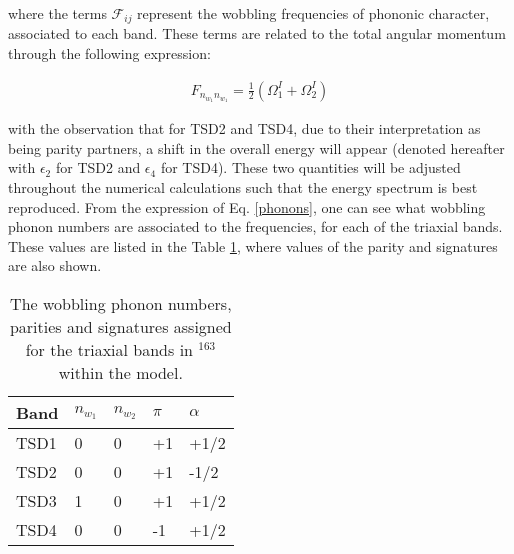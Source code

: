 \documentclass[%
 reprint,
 amsmath,
 amssymb,
 aps,
]{revtex4-2}
\begin{document}
where the terms $\mathcal{F}_{ij}$ represent the wobbling frequencies of phononic character, associated to each band. These terms are related to the total angular momentum through the following expression:

\begin{align}
    F_{n_{w_1}n_{w_1}}=\frac{1}{2}\left(\Omega_1^I+\Omega_2^I\right) \label{phonons}
\end{align}

with the observation that for TSD2 and TSD4, due to their interpretation as being parity partners, a shift in the overall energy will appear (denoted hereafter with $\epsilon_2$ for TSD2 and $\epsilon_4$ for TSD4). These two quantities will be adjusted throughout the numerical calculations such that the energy spectrum is best reproduced. From the expression of Eq. \ref{phonons}, one can see what wobbling phonon numbers are associated to the frequencies, for each of the triaxial bands. These values are listed in the Table \ref{tabular_phonon_numbers}, where values of the parity and signatures are also shown.

\begin{table}
    \centering
  \begin{tabular}{lllll}
  \hline
Band & $n_{w_1}$ & $n_{w_2}$ & $\pi$ & $\alpha$ \\
\hline
\hline
TSD1 &     0      &       0    &     +1  &    +1/2      \\
TSD2 &    0       &       0    &   +1    &        -1/2  \\
TSD3 &     1      &     0      &    +1   &        +1/2  \\
TSD4 &     0      &     0      &    -1   &     +1/2    \\
\hline
\end{tabular}
    \caption{The wobbling phonon numbers, parities and signatures assigned for the triaxial bands in $^{163}$ within the model.}
    \label{tabular_phonon_numbers}
\end{table}


\end{document}
